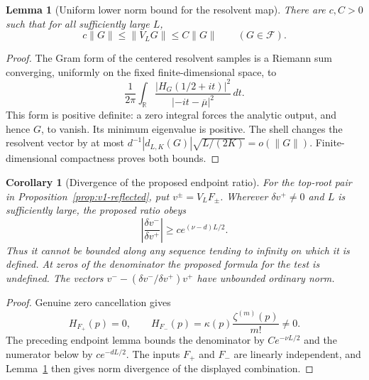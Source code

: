 \documentclass[11pt]{article}
\newtheorem{lemma}[theorem]{Lemma}
\newtheorem{corollary}[theorem]{Corollary}
\theoremstyle{remark}
\begin{document}
\begin{lemma}[Uniform lower norm bound for the resolvent map]
\label{lem:v11-resolvent-gram}
There are $c,C>0$ such that for all sufficiently large $L$,
\[
 c\|G\|\le\|V_LG\|\le C\|G\|\qquad(G\in\mathcal F).
\]
\end{lemma}
\begin{proof}
The Gram form of the centered resolvent samples is a Riemann sum
converging, uniformly on the fixed finite-dimensional space, to
\[
 \frac1{2\pi}\int_{\mathbb R}
       \frac{|H_G(1/2+it)|^2}{|-it-\overline\mu|^2}\,dt.
\]
This form is positive definite: a zero integral forces the analytic
output, and hence $G$, to vanish. Its minimum eigenvalue is positive.
The shell changes the resolvent vector by at most
$d^{-1}|d_{L,K}(G)|\sqrt{L/(2K)}=o(\|G\|)$.
Finite-dimensional compactness proves both bounds.
\end{proof}

\begin{corollary}[Divergence of the proposed endpoint ratio]
\label{cor:v11-ratio}
For the top-root pair in Proposition~\ref{prop:v1-reflected}, put
$v^\pm=V_LF_\pm$. Wherever $\delta v^+\ne0$ and $L$ is sufficiently
large, the proposed ratio obeys
\[
 \left|\frac{\delta v^-}{\delta v^+}\right|
       \ge c e^{(\nu-d)L/2}.
\]
Thus it cannot be bounded along any sequence tending to infinity on
which it is defined. At zeros of the denominator the proposed formula
for the test is undefined. The vectors
$v^- -(\delta v^-/\delta v^+)v^+$ have unbounded ordinary norm.
\end{corollary}
\begin{proof}
Genuine zero cancellation gives
\[
 H_{F_+}(p)=0,\qquad
 H_{F_-}(p)=\kappa(p)\frac{\zeta^{(m)}(p)}{m!}\ne0.
\]
The preceding endpoint lemma bounds the denominator by $Ce^{-\nu L/2}$
and the numerator below by $ce^{-dL/2}$. The inputs $F_+$ and $F_-$
are linearly independent, and Lemma~\ref{lem:v11-resolvent-gram}
then gives norm divergence of the displayed combination.
\end{proof}
\end{document}
